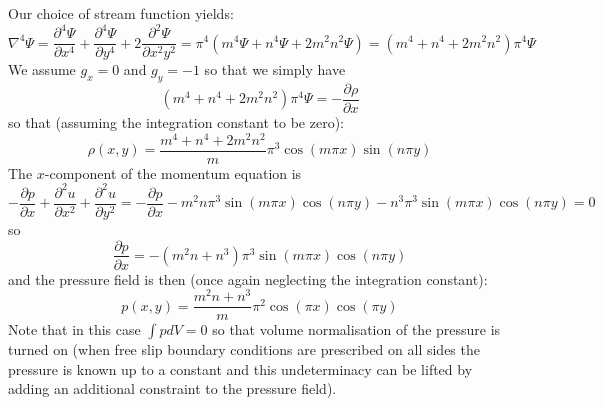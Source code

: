 Our choice of stream function yields:
\[
{\nabla}^4 \Psi= 
\frac{\partial^4 \Psi}{\partial x^4}+
\frac{\partial^4 \Psi}{\partial y^4}+
2\frac{\partial^2 \Psi}{\partial x^2 y^2}
=\pi^4 ( m^4 \Psi + n^4 \Psi + 2m^2n^2 \Psi) = (m^4 + n^4 + 2m^2n^2)\pi^4 \Psi
\]
We assume $g_x=0$ and $g_y=-1$ so that we simply have 
\begin{equation}
(m^4 + n^4 + 2m^2n^2)\pi^4 \Psi = -\frac{\partial \rho}{\partial x}
\end{equation}
so that (assuming the integration constant to be zero):
\[
\rho(x,y) = \frac{m^4 + n^4 + 2m^2n^2}{m} \pi^3  \cos(m \pi x)\sin(n \pi y)
\]
The $x$-component of the momentum equation is 
\[
-\frac{\partial p}{\partial x} + 
\frac{\partial^2 u}{\partial x^2}+
\frac{\partial^2 u}{\partial y^2} =
-\frac{\partial p}{\partial x} 
-m^2 n \pi^3 \sin (m\pi x)\cos(n\pi y)
- n^3 \pi^3 \sin (m\pi x)\cos(n\pi y)
=0
\]
so 
\[
\frac{\partial p}{\partial x} =-(m^2n+n^3)\pi^3 \sin (m\pi x)\cos(n \pi y)
\]
and the pressure field is then (once again neglecting the integration constant):
\[
p(x,y)= \frac{m^2n+n^3}{m} \pi^2 \cos (\pi x)\cos(\pi y)
\]
Note that in this case $\int p dV =0$ so that volume normalisation of the pressure is turned on 
(when free slip boundary conditions are prescribed on all sides the pressure is known 
up to a constant and this undeterminacy can be lifted by adding an additional constraint 
to the pressure field).

